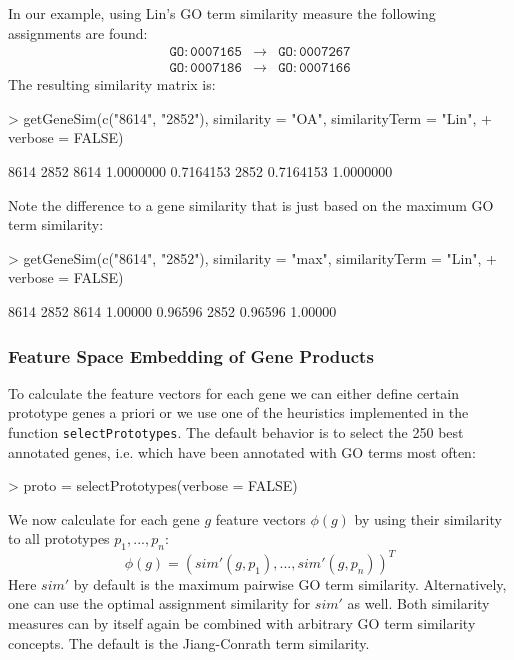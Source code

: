 \documentclass[12pt,a4paper]{article}
\begin{document}
In our example, using Lin's GO term similarity measure the following assignments are found:
\begin{eqnarray}
\mathtt{GO:0007165} & \to & \mathtt{GO:0007267}\\
\mathtt{GO:0007186} & \to & \mathtt{GO:0007166}
\end{eqnarray}
The resulting similarity matrix is:
\begin{Schunk}
\begin{Sinput}
> getGeneSim(c("8614", "2852"), similarity = "OA", similarityTerm = "Lin", 
+     verbose = FALSE)
\end{Sinput}
\begin{Soutput}
          8614      2852
8614 1.0000000 0.7164153
2852 0.7164153 1.0000000
\end{Soutput}
\end{Schunk}

Note the difference to a gene similarity that is just based on the maximum GO term similarity:
\begin{Schunk}
\begin{Sinput}
> getGeneSim(c("8614", "2852"), similarity = "max", similarityTerm = "Lin", 
+     verbose = FALSE)
\end{Sinput}
\begin{Soutput}
        8614    2852
8614 1.00000 0.96596
2852 0.96596 1.00000
\end{Soutput}
\end{Schunk}

\subsubsection{Feature Space Embedding of Gene Products}

To calculate the feature vectors for each gene we can either define certain prototype genes a priori or we use one of the heuristics implemented in the function {\tt selectPrototypes}. The default behavior is to select the 250 best annotated genes, i.e. which have been annotated with GO terms most often:
\begin{Schunk}
\begin{Sinput}
> proto = selectPrototypes(verbose = FALSE)
\end{Sinput}
\end{Schunk}

We now calculate for each gene $g$ feature vectors $\phi(g)$  by using their similarity to all prototypes $p_1,...,p_n$:
\begin{equation}
\phi(g) = (sim'(g,p_1),...,sim'(g,p_n))^T
\end{equation}
Here $sim'$ by default is the maximum pairwise GO term similarity. Alternatively, one can use the optimal assignment similarity for $sim'$ as well. Both similarity measures can by itself again be combined with arbitrary GO term similarity concepts. The default is the Jiang-Conrath term similarity.
\end{document}
